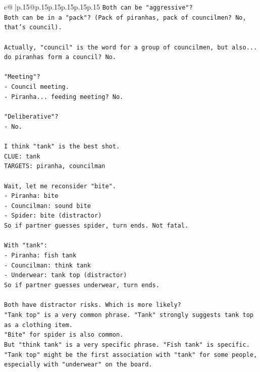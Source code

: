 \documentclass{article}
\begin{document}
{\begin{supertabular}{c@{$\;$}|p{.15\linewidth}@{}p{.15\linewidth}p{.15\linewidth}p{.15\linewidth}p{.15\linewidth}p{.15\linewidth}}
{{{\texttt{Both can be "aggressive"?} \\
\texttt{Both can be in a "pack"? (Pack of piranhas, pack of councilmen? No, that's council).} \\
\\ 
\texttt{Actually, "council" is the word for a group of councilmen, but also... do piranhas form a council? No.} \\
\\ 
\texttt{"Meeting"?} \\
\texttt{{-} Council meeting.} \\
\texttt{{-} Piranha... feeding meeting? No.} \\
\\ 
\texttt{"Deliberative"?} \\
\texttt{{-} No.} \\
\\ 
\texttt{I think "tank" is the best shot.} \\
\texttt{CLUE: tank} \\
\texttt{TARGETS: piranha, councilman} \\
\\ 
\texttt{Wait, let me reconsider "bite".} \\
\texttt{{-} Piranha: bite} \\
\texttt{{-} Councilman: sound bite} \\
\texttt{{-} Spider: bite (distractor)} \\
\texttt{So if partner guesses spider, turn ends. Not fatal.} \\
\\ 
\texttt{With "tank":} \\
\texttt{{-} Piranha: fish tank} \\
\texttt{{-} Councilman: think tank} \\
\texttt{{-} Underwear: tank top (distractor)} \\
\texttt{So if partner guesses underwear, turn ends.} \\
\\ 
\texttt{Both have distractor risks. Which is more likely?} \\
\texttt{"Tank top" is a very common phrase. "Tank" strongly suggests tank top as a clothing item.} \\
\texttt{"Bite" for spider is also common.} \\
\texttt{But "think tank" is a very specific phrase. "Fish tank" is specific.} \\
\texttt{"Tank top" might be the first association with "tank" for some people, especially with "underwear" on the board.} \\
}}}
\end{supertabular}}
\end{document}
